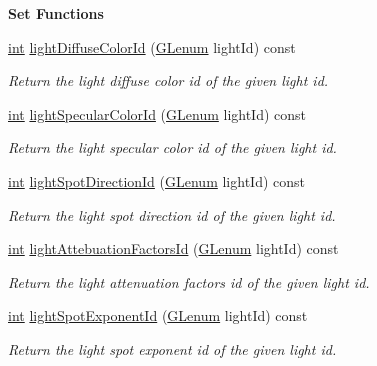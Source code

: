 \begin{Indent}{\bf Set Functions}
\begin{DoxyCompactItemize}
\hyperlink{ioapi_8h_a787fa3cf048117ba7123753c1e74fcd6}{int} \hyperlink{class_g_l_c___shader_a630895453af70c155fcc18f91b8550e4}{light\-Diffuse\-Color\-Id} (\hyperlink{glext_8h_a508b2dec21679e2e346cad3e0d1969bf}{G\-Lenum} light\-Id) const 
\begin{DoxyCompactList}\small\item\em Return the light diffuse color id of the given light id. \end{DoxyCompactList}\item 
\hyperlink{ioapi_8h_a787fa3cf048117ba7123753c1e74fcd6}{int} \hyperlink{class_g_l_c___shader_afa6b464969fc4d758f93c623e2021eab}{light\-Specular\-Color\-Id} (\hyperlink{glext_8h_a508b2dec21679e2e346cad3e0d1969bf}{G\-Lenum} light\-Id) const 
\begin{DoxyCompactList}\small\item\em Return the light specular color id of the given light id. \end{DoxyCompactList}\item 
\hyperlink{ioapi_8h_a787fa3cf048117ba7123753c1e74fcd6}{int} \hyperlink{class_g_l_c___shader_afddb6f276cb58aac6a397a5c8ff328f4}{light\-Spot\-Direction\-Id} (\hyperlink{glext_8h_a508b2dec21679e2e346cad3e0d1969bf}{G\-Lenum} light\-Id) const 
\begin{DoxyCompactList}\small\item\em Return the light spot direction id of the given light id. \end{DoxyCompactList}\item 
\hyperlink{ioapi_8h_a787fa3cf048117ba7123753c1e74fcd6}{int} \hyperlink{class_g_l_c___shader_a060c808ebc23459a388884f054dd6d4e}{light\-Attebuation\-Factors\-Id} (\hyperlink{glext_8h_a508b2dec21679e2e346cad3e0d1969bf}{G\-Lenum} light\-Id) const 
\begin{DoxyCompactList}\small\item\em Return the light attenuation factors id of the given light id. \end{DoxyCompactList}\item 
\hyperlink{ioapi_8h_a787fa3cf048117ba7123753c1e74fcd6}{int} \hyperlink{class_g_l_c___shader_ad7f24dd74187d6871bdffd0dcc6fd559}{light\-Spot\-Exponent\-Id} (\hyperlink{glext_8h_a508b2dec21679e2e346cad3e0d1969bf}{G\-Lenum} light\-Id) const 
\begin{DoxyCompactList}\small\item\em Return the light spot exponent id of the given light id. \end{DoxyCompactList}\item 

\end{DoxyCompactItemize}
\end{Indent}
